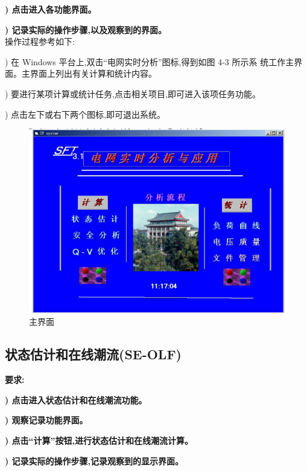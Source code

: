 \documentclass[a4paper]{ctexrep}
\begin{document}
                    \textbf{) 点击进入各功能界面。}

                    \textbf{) 记录实际的操作步骤,以及观察到的界面。}\\ 

                    操作过程参考如下:

                    ) 在 Windows 平台上,双击“电网实时分析”图标,得到如图 4-3 所示系
                    统工作主界面。主界面上列出有关计算和统计内容。

                    ) 要进行某项计算或统计任务,点击相关项目,即可进入该项任务功能。

                    ) 点击左下或右下两个图标,即可退出系统。

                    \begin{figure}[htbp]
                        \centering
                        \includegraphics[width=12cm]{3.pdf}
                        \caption{主界面}
                    \end{figure}
                    
                \subsection{状态估计和在线潮流(SE-OLF)}
                    \textbf{要求:}

                    \textbf{) 点击进入状态估计和在线潮流功能。}

                    \textbf{) 观察记录功能界面。}

                    \textbf{) 点击“计算”按钮,进行状态估计和在线潮流计算。}

                    \textbf{) 记录实际的操作步骤,记录观察到的显示界面。}
\end{document}
